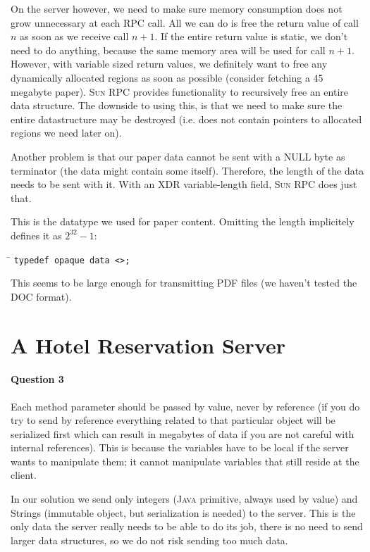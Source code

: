 \documentclass[a4paper,10pt]{article}
\begin{document}
On the server however, we need to make sure memory consumption does
not grow unnecessary at each RPC call. All we can do is free the
return value of call $n$ as soon as we receive call $n+1$.
If the entire return value is static, we don't need to do anything,
because the same memory area will be used for call $n+1$.
However, with variable sized return values, we definitely want to
free any dynamically allocated regions as soon as possible (consider
fetching a 45 megabyte paper). \textsc{Sun RPC} provides functionality to
recursively free an entire data structure. The downside to using this,
is that we need to make sure the entire datastructure may be destroyed
(i.e. does not contain pointers to allocated regions we need later
on).

Another problem is that our paper data cannot be sent with a NULL byte
as terminator (the data might contain some itself). Therefore, the
length of the data needs to be sent with it. With an \textsc{XDR}
variable-length field, \textsc{Sun RPC} does just that.

This is the datatype we used for paper content. Omitting the length
implicitely defines it as $2^{32} - 1$:

\begin{tabbing}
\hspace{20pt}\=\kill
 \>\texttt{typedef opaque data <>;}
\end{tabbing}

This seems to be large enough for transmitting \textsc{PDF} files (we haven't
tested the \textsc{DOC} format).


\section{A Hotel Reservation Server}
\paragraph{Question 3}
Each method parameter should be passed by value, never by reference
(if you do try to send by reference everything related to that
particular object will be serialized first which can result in
megabytes of data if you are not careful with internal
references). This is because the variables have to be local if the
server wants to manipulate them; it cannot manipulate variables that
still reside at the client.

In our solution we send only integers (\textsc{Java} primitive, always used by
value) and Strings (immutable object, but serialization is needed) to
the server. This is the only data the server really needs to be able
to do its job, there is no need to send larger data structures, so we
do not risk sending too much data.
\end{document}
